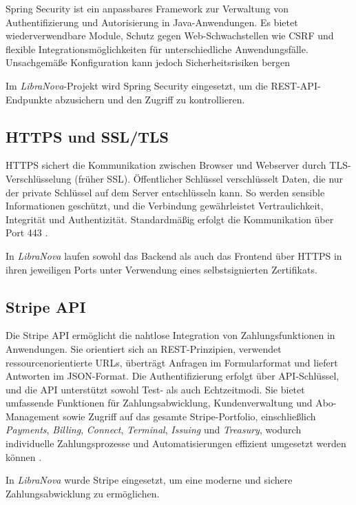 Spring Security ist ein anpassbares Framework zur Verwaltung von Authentifizierung und Autorisierung in Java-Anwendungen. Es bietet wiederverwendbare Module, Schutz gegen Web-Schwachstellen wie CSRF und flexible Integrationsmöglichkeiten für unterschiedliche Anwendungsfälle. Unsachgemäße Konfiguration kann jedoch Sicherheitsrisiken bergen  \cite{SPRNGSECURITY2025}

\noindent Im \textit{LibraNova}-Projekt wird Spring Security eingesetzt, um die REST-API-Endpunkte abzusichern und den Zugriff zu kontrollieren.

\subsection{HTTPS und SSL/TLS}

HTTPS sichert die Kommunikation zwischen Browser und Webserver durch TLS-Verschlüsselung (früher SSL). Öffentlicher Schlüssel verschlüsselt Daten, die nur der private Schlüssel auf dem Server entschlüsseln kann. So werden sensible Informationen geschützt, und die Verbindung gewährleistet Vertraulichkeit, Integrität und Authentizität. Standardmäßig erfolgt die Kommunikation über Port 443 \cite{HTTPS2025}. 

\noindent In \textit{LibraNova} laufen sowohl das Backend als auch das Frontend über HTTPS in ihren jeweiligen Ports unter Verwendung eines selbstsignierten Zertifikats.

\subsection{Stripe API}

Die Stripe API ermöglicht die nahtlose Integration von Zahlungsfunktionen in Anwendungen. Sie orientiert sich an REST-Prinzipien, verwendet ressourcenorientierte URLs, überträgt Anfragen im Formularformat und liefert Antworten im JSON-Format. Die Authentifizierung erfolgt über API-Schlüssel, und die API unterstützt sowohl Test- als auch Echtzeitmodi. Sie bietet umfassende Funktionen für Zahlungsabwicklung, Kundenverwaltung und Abo-Management sowie Zugriff auf das gesamte Stripe-Portfolio, einschließlich \textit{Payments}, \textit{Billing}, \textit{Connect}, \textit{Terminal}, \textit{Issuing} und \textit{Treasury}, wodurch individuelle Zahlungsprozesse und Automatisierungen effizient umgesetzt werden können \cite{STRIPEAPI2025}.

\noindent In  \textit{LibraNova} wurde Stripe eingesetzt, um eine moderne und sichere Zahlungsabwicklung zu ermöglichen.

